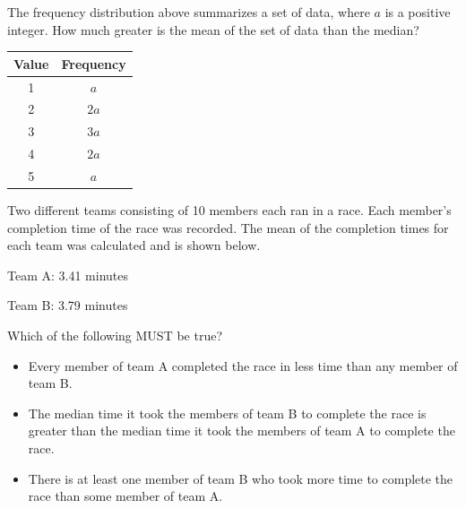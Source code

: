 \vspace{0.75em}


\newpage

\noindent\markforreview
\vspace{1em}

The frequency distribution above summarizes a set of data, where $a$ is a positive integer.  
How much greater is the mean of the set of data than the median?

\vspace{1em}

\begin{tabular}{|c|c|}
\hline
\textbf{Value} & \textbf{Frequency} \\
\hline
1 & $a$ \\
2 & $2a$ \\
3 & $3a$ \\
4 & $2a$ \\
5 & $a$ \\
\hline
\end{tabular}

\vspace{1em}



\vspace{2em}
\newpage
\noindent\markforreview
\vspace{1em}

Two different teams consisting of 10 members each ran in a race. Each member’s completion time of the race was recorded.  
The mean of the completion times for each team was calculated and is shown below.

\vspace{0.5em}

Team A: 3.41 minutes 

Team B: 3.79 minutes



Which of the following MUST be true?

\begin{itemize}
\item[I.] Every member of team A completed the race in less time than any member of team B.
\item[II.] The median time it took the members of team B to complete the race is greater than the median time it took the members of team A to complete the race.
\item[III.] There is at least one member of team B who took more time to complete the race than some member of team A.
\end{itemize}

